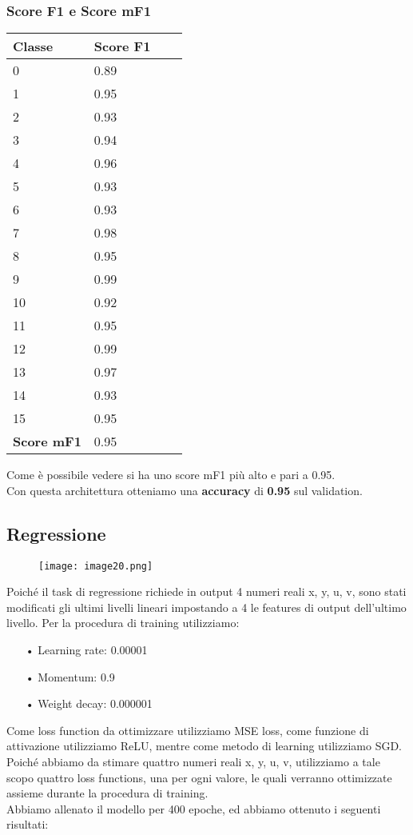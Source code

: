 \subsubsection{Score F1 e Score mF1}
\begin{center}
	\begin{tabular}{| l | l | l | l |}
		\hline
		Classe & Score F1 \\ \hline
		0 & 0.89 \\ \hline
		1 & 0.95 \\ \hline
		2 & 0.93 \\ \hline
		3 & 0.94 \\ \hline
		4 & 0.96 \\ \hline
		5 & 0.93 \\ \hline
		6 & 0.93 \\ \hline
		7 & 0.98 \\ \hline
		8 & 0.95 \\ \hline
		9 & 0.99 \\ \hline
		10 & 0.92 \\ \hline
		11 & 0.95 \\ \hline
		12 & 0.99 \\ \hline
		13 & 0.97 \\ \hline
		14 & 0.93\\ \hline
		15 & 0.95 \\ \hline 
		{\bf Score mF1} & 0.95 \\ \hline							
	\end{tabular}
\end{center}
Come è possibile vedere si ha uno score mF1 più alto e pari a 0.95.
\\
Con questa architettura otteniamo una {\bf accuracy} di {\bf 0.95} sul validation. 

\subsection{Regressione}
\begin{figure}[H]
	\centering
	\texttt{[image: image20.png]}
\end{figure}
Poiché il task di regressione richiede in output 4 numeri reali x, y, u, v, sono stati modificati gli ultimi livelli lineari impostando a 4 le features di output dell’ultimo livello.
Per la procedura di training utilizziamo: 
\begin{itemize}
	\item[•]Learning rate: 0.00001
	\item[•]Momentum: 0.9
	\item[•]Weight decay: 0.000001
\end{itemize}
Come loss function da ottimizzare utilizziamo MSE loss, come funzione di attivazione utilizziamo ReLU, mentre come metodo di learning utilizziamo SGD. \\
Poiché abbiamo da stimare quattro numeri reali x, y, u, v, utilizziamo a tale scopo quattro loss functions, una per ogni valore, le quali verranno ottimizzate assieme durante la procedura di training. \\
Abbiamo allenato il modello per 400 epoche, ed abbiamo ottenuto i seguenti risultati:

